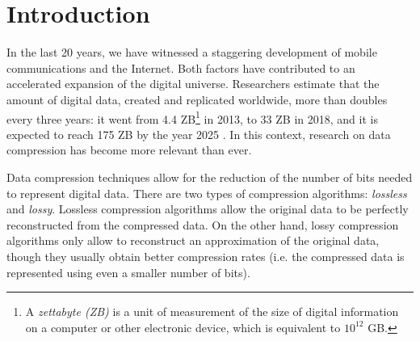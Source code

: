 
\chapter{Introduction} %
\label{intro:intro} %


\newcommand{\maxerror}{\textit{$\epsilon$}\xspace}
\newcommand{\alOne}{a_1}
\newcommand{\alTwo}{a_2}
\newcommand{\MaskVar}[1]{$\text{{#1}}_\textit{M}$}
\newcommand{\NonMaskVar}[1]{$\text{{#1}}_\textit{NM}$}
\newcommand{\win}{\textit{w}}

\newcommand{\RD}{\textnormal{RD}}
\newcommand{\RDit}{\textit{RD}}
\newcommand{\CRit}{\textit{CR}}
\newcommand{\CR}{\textnormal{CR}}

\newcommand{\zetafoot}{\footnote{A \textit{zettabyte (ZB)} is a unit of measurement of the size of digital information on a computer or other electronic device, which is equivalent to $10^{12}$ GB.} }


In the last 20 years, we have witnessed a staggering development of mobile communications and the Internet. Both factors have contributed to an accelerated expansion of the digital universe. Researchers estimate that the amount of digital data, created and replicated worldwide, more than doubles every three years: it went from 4.4 ZB\zetafoot in 2013, to 33 ZB in 2018, and it is expected to reach 175 ZB by the year 2025 \cite{Digitalization1, Digitalization2}. In this context, research on data compression has become more relevant than ever.


Data compression techniques allow for the reduction of the number of bits needed to represent digital data. There are two types of compression algorithms: \textit{lossless} and \textit{lossy}. Lossless compression algorithms allow the original data to be perfectly reconstructed from the compressed data. On the other hand, lossy compression algorithms only allow to reconstruct an approximation of the original data, though they usually obtain better compression rates (i.e. the compressed data is represented using even a smaller number of bits).


